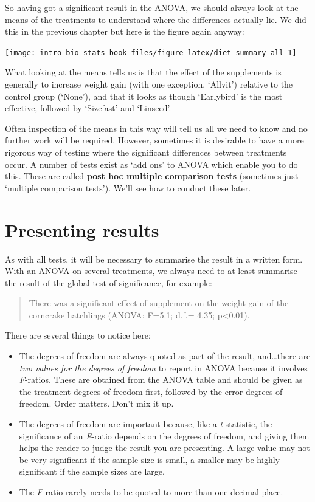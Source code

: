 \documentclass[
]{book}
\begin{document}
So having got a significant result in the ANOVA, we should always look at the means of the treatments to understand where the differences actually lie. We did this in the previous chapter but here is the figure again anyway:

\begin{center}\texttt{[image: intro-bio-stats-book\_files/figure-latex/diet-summary-all-1]} \end{center}

What looking at the means tells us is that the effect of the supplements is generally to increase weight gain (with one exception, `Allvit') relative to the control group (`None'), and that it looks as though `Earlybird' is the most effective, followed by `Sizefast' and `Linseed'.

Often inspection of the means in this way will tell us all we need to know and no further work will be required. However, sometimes it is desirable to have a more rigorous way of testing where the significant differences between treatments occur. A number of tests exist as `add ons' to ANOVA which enable you to do this. These are called \textbf{post hoc multiple comparison tests} (sometimes just `multiple comparison tests'). We'll see how to conduct these later.

\hypertarget{summarise-results-anova}{%
\section{Presenting results}\label{summarise-results-anova}}

As with all tests, it will be necessary to summarise the result in a written form. With an ANOVA on several treatments, we always need to at least summarise the result of the global test of significance, for example:

\begin{quote}
There was a significant effect of supplement on the weight gain of the corncrake hatchlings (ANOVA: F=5.1; d.f.= 4,35; p\textless0.01).
\end{quote}

There are several things to notice here:

\begin{itemize}
\item
  The degrees of freedom are always quoted as part of the result, and\ldots there are \emph{two values for the degrees of freedom} to report in ANOVA because it involves \emph{F}-ratios. These are obtained from the ANOVA table and should be given as the treatment degrees of freedom first, followed by the error degrees of freedom. Order matters. Don't mix it up.
\item
  The degrees of freedom are important because, like a \emph{t}-statistic, the significance of an \emph{F}-ratio depends on the degrees of freedom, and giving them helps the reader to judge the result you are presenting. A large value may not be very significant if the sample size is small, a smaller may be highly significant if the sample sizes are large.
\item
  The \emph{F}-ratio rarely needs to be quoted to more than one decimal place.
\end{itemize}
\end{document}
